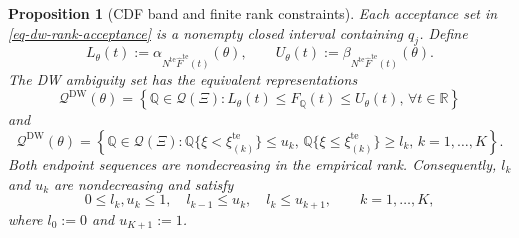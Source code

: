 \documentclass[review,11pt,3p,authoryear,nopreprintline]{elsarticle}
\newtheorem{proposition}{Proposition}
\begin{document}
\begin{proposition}[CDF band and finite rank constraints]
  \label{prop-finite-rank-constraints}
  Each acceptance set in \eqref{eq-dw-rank-acceptance} is a nonempty closed interval containing $q_j$. Define
  \[
    L_\theta(t):=\alpha_{N^{\mathrm{te}}\widehat F^{\mathrm{te}}(t)}(\theta),
    \qquad
    U_\theta(t):=\beta_{N^{\mathrm{te}}\widehat F^{\mathrm{te}}(t)}(\theta).
  \]
  The DW ambiguity set has the equivalent representations
  \begin{equation}
    \mathscr Q^{\mathrm{DW}}(\theta) =\left\{\mathbb Q\in\mathcal Q(\Xi): L_\theta(t)\le F_{\mathbb Q}(t)\le U_\theta(t), \, \forall t\in\mathbb R\right\}
    \label{eq-dw-band-representation}
  \end{equation}
  and
  \begin{equation}
    \mathscr Q^{\mathrm{DW}}(\theta)
    =\left\{\mathbb Q\in\mathcal Q(\Xi): \mathbb Q\{\xi<\xi_{(k)}^{\mathrm{te}}\}\le u_k, \, \mathbb Q\{\xi\le \xi_{(k)}^{\mathrm{te}}\}\ge l_k, \, k=1,\ldots,K \right\}.
    \label{eq-finite-rank-constraints}
  \end{equation}
  Both endpoint sequences are nondecreasing in the empirical rank. Consequently, $l_k$ and $u_k$ are nondecreasing and satisfy
  \begin{equation}
    0\le l_k,u_k\le1,\quad
    l_{k-1}\le u_k,\quad
    l_k\le u_{k+1},
    \qquad k=1,\ldots,K,
    \label{eq-rank-compatibility}
  \end{equation}
  where $l_0:=0$ and $u_{K+1}:=1$.
\end{proposition}
\end{document}
